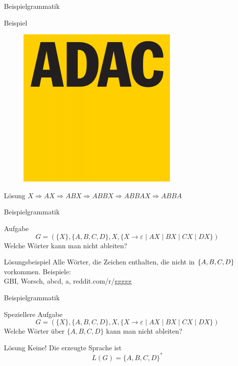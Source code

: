 \begin{frame}{Beispielgrammatik}
\begin{exampleblock}{Beispiel}
\begin{figure}[h!]
			\includegraphics[scale=0.26]{../figures/ADAC-Logo.png} \pause
		\end{figure} 
	
\end{exampleblock}

\begin{block}{Lösung}
		$X \Rightarrow AX \Rightarrow ABX \Rightarrow ABBX \Rightarrow ABBAX \Rightarrow ABBA$	
\end{block}
		
\end{frame}

\begin{frame}{Beispielgrammatik}
	\begin{exampleblock}{Aufgabe}
		\[G = (\{X\}, \{A, B, C, D\}, X, \{X \to \varepsilon \mid AX \mid BX \mid CX \mid DX\})\]	
		Welche Wörter kann man nicht ableiten?
	\end{exampleblock}
\pause
	\begin{block}{Lösungsbeispiel}
		\centering
		Alle Wörter, die Zeichen enthalten, die nicht in $\left\{ A, B, C, D \right\}$ vorkommen. Beispiele:\\[1em]

		\centering GBI, Worsch, abcd, a, reddit.com/r/ggggg
	\end{block}
\end{frame}

\begin{frame}{Beispielgrammatik}
	\begin{exampleblock}{Speziellere Aufgabe}
		\[G = (\{X\}, \{A, B, C, D\}, X, \{X \to \varepsilon \mid AX \mid BX \mid CX \mid DX\})\]	
		Welche Wörter über $\{A, B, C, D\}$ kann man nicht ableiten?
	\end{exampleblock}
\pause
	\begin{block}{Lösung}
		Keine! Die erzeugte Sprache ist
		$$L(G) = \{A,B,C,D\}^\ast$$
	\end{block}
\end{frame}


